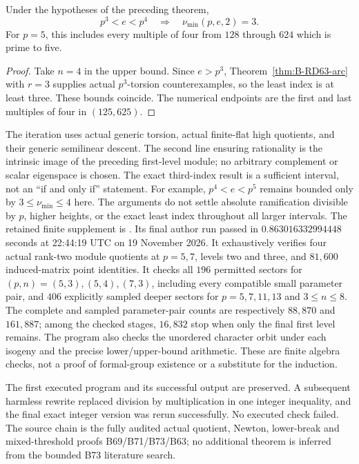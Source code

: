 \begin{corollary}
\label{cor:B-RD74-third-index}
Under the hypotheses of the preceding theorem,
\[
 p^3<e<p^4\quad\Longrightarrow\quad
 \boxed{\nu_{\min}(p,e,2)=3}.
 \tag{B-RD74.10}
\]
For \(p=5\), this includes every multiple of four from
\(128\) through \(624\) which is prime to five.
\end{corollary}
\begin{proof}
Take \(n=4\) in the upper bound. Since \(e>p^3\),
Theorem~\ref{thm:B-RD63-arc} with \(r=3\) supplies actual
\(p^3\)-torsion counterexamples, so the least index is at
least three. These bounds coincide. The numerical endpoints
are the first and last multiples of four in \((125,625)\).
\end{proof}

\begin{remark}
\label{rem:B-RD74-scope}
The iteration uses actual generic torsion, actual finite-flat
high quotients, and their generic semilinear descent. The
second line ensuring rationality is the intrinsic image of
the preceding first-level module; no arbitrary complement
or scalar eigenspace is chosen. The exact third-index result
is a sufficient interval, not an ``if and only if'' statement.
For example, \(p^4<e<p^5\) remains bounded only by
\(3\le\nu_{\min}\le4\) here. The arguments do not settle
absolute ramification divisible by \(p\), higher heights,
or the exact least index throughout all larger intervals.
The retained finite supplement is
.
Its final author run passed in \(0.863016332994448\) seconds
at 22:44:19 UTC on 19 November 2026. It exhaustively verifies
four actual rank-two module quotients at \(p=5,7\), levels
two and three, and \(81{,}600\) induced-matrix point identities.
It checks all \(196\) permitted sectors for
\((p,n)=(5,3),(5,4),(7,3)\), including every compatible small
parameter pair, and \(406\) explicitly sampled deeper sectors
for \(p=5,7,11,13\) and \(3\le n\le8\).
The complete and sampled parameter-pair counts are respectively
\(88{,}870\) and \(161{,}887\); among the checked stages,
\(16{,}832\) stop when only the final first level remains.
The program also checks the unordered character orbit under
each isogeny and the precise lower/upper-bound arithmetic.
These are finite algebra checks, not a proof of formal-group
existence or a substitute for the induction.

The first executed program and its successful output are
preserved. A subsequent harmless rewrite replaced division by
multiplication in one integer inequality, and the final exact
integer version was rerun successfully. No executed check
failed. The source chain is the fully audited actual quotient,
Newton, lower-break and mixed-threshold proofs B69/B71/B73/B63;
no additional theorem is inferred from the bounded B73
literature search.
\end{remark}
